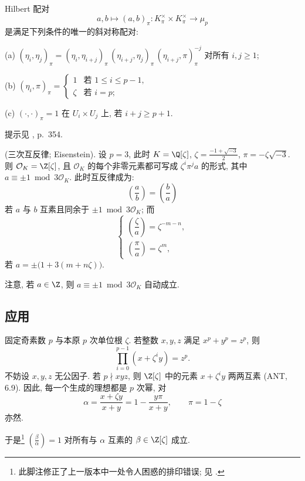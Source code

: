 \begin{proposition}\label{prop:viii.5.12}
Hilbert 配对
\[
a,b\mapsto(a,b)_{\pi}:K_{\pi}^{\times}\times K_{\pi}^{\times}\to\mu_{p}
\]
是满足下列条件的唯一的斜对称配对:

(a) $(\eta_{i},\eta_{j})_{\pi}=(\eta_{i},\eta_{i+j})_{\pi}\,(\eta_{i+j},\eta_{j})_{\pi}\,(\eta_{i+j},\pi)_{\pi}^{-j}$ 对所有 $i,j\ge 1$;

(b) $(\eta_{i},\pi)_{\pi}=
\begin{cases}
1 & \text{若 } 1\le i\le p-1,\\
\zeta & \text{若 } i=p;
\end{cases}$

(c) $(\cdot,\cdot)_{\pi}=1$ 在 $U_{i}\times U_{j}$ 上, 若 $i+j\ge p+1$.
\end{proposition}

提示见 \cite{CasselsFrohlich1967}, p.~354.

\begin{example}\label{ex:viii.5.13}
(三次互反律; Eisenstein). 设 $p=3$, 此时 $K=\Q[\zeta]$, $\zeta=\frac{-1+\sqrt{-3}}{2}$, $\pi=-\zeta\sqrt{-3}$. 则 $\mathcal{O}_K=\Z[\zeta]$, 且 $\mathcal{O}_K$ 的每个非零元素都可写成 $\zeta^{i}\pi^{j}a$ 的形式, 其中 $a\equiv\pm1 \bmod 3\mathcal{O}_K$. 此时互反律成为:
\[
\left(\frac{a}{b}\right)=\left(\frac{b}{a}\right)
\]
若 $a$ 与 $b$ 互素且同余于 $\pm 1 \bmod 3\mathcal{O}_K$; 而
\[
\begin{cases}
\left(\dfrac{\zeta}{a}\right)=\zeta^{-m-n},\\[2ex]
\left(\dfrac{\pi}{a}\right)=\zeta^{m},
\end{cases}
\]
若 $a=\pm\big(1+3(m+n\zeta)\big)$.

注意, 若 $a\in\Z$, 则 $a\equiv\pm1 \bmod 3\mathcal{O}_K$ 自动成立.
\end{example}

\subsection*{应用}

固定奇素数 $p$ 与本原 $p$ 次单位根 $\zeta$. 若整数 $x,y,z$ 满足 $x^{p}+y^{p}=z^{p}$, 则
\[
\prod_{i=0}^{p-1}(x+\zeta^{i}y)=z^{p}.
\]
不妨设 $x,y,z$ 无公因子. 若 $p\nmid xyz$, 则 $\Z[\zeta]$ 中的元素 $x+\zeta^{i}y$ 两两互素 (ANT, 6.9). 因此, 每一个生成的理想都是 $p$ 次幂, 对
\[
\alpha=\frac{x+\zeta y}{x+y}=1-\frac{y\pi}{x+y},\qquad \pi=1-\zeta
\]
亦然.

于是\footnote{此脚注修正了上一版本中一处令人困惑的排印错误; 见 .}
$\left(\frac{\beta}{\alpha}\right)=1$ 对所有与 $\alpha$ 互素的 $\beta\in\Z[\zeta]$ 成立.

